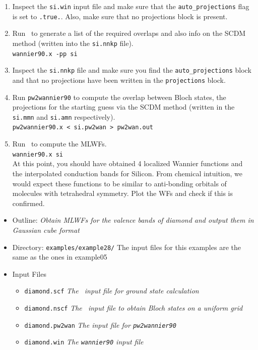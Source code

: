 \documentclass[a4paper,11pt,twoside]{article}
\begin{document}
\begin{itemize}
\begin{enumerate}
    \item Inspect the {\tt si.win} input file and make sure that the {\tt auto\_projections} flag is set to {\tt .true.}. Also, make sure that no projections block is present.
    \item Run \wannier\ to generate a list of the required overlaps and also info on the SCDM method (written
    into the {\tt si.nnkp} file).\\ 
    {\tt wannier90.x -pp si}
    \item Inspect the {\tt si.nnkp} file and make sure you find the {\tt auto\_projections} block and that no projections have been written in the {\tt projections} block.

    \item Run {\tt pw2wannier90} to compute the overlap between Bloch
    states, the projections for the starting guess via the SCDM method (written in the
    {\tt si.mmn} and {\tt si.amn} respectively).\\  
    {\tt pw2wannier90.x < si.pw2wan > pw2wan.out}

    \item Run \wannier\ to compute the MLWFs.\\
    {\tt wannier90.x si}\\
    At this point, you should have obtained 4 localized Wannier functions and the interpolated conduction bands for Silicon. From chemical intuition, we would expect these functions to be similar to anti-bonding orbitals of molecules with tetrahedral symmetry. Plot the WFs and check if this is confirmed. 
  \end{enumerate}
\end{itemize}

\begin{itemize}
\item{Outline: \it{Obtain MLWFs for the valence bands of diamond and output them in Gaussian cube format}}
\item{Directory: {\tt examples/example28/}}
The input files for this examples are the same as the ones in example05
\item{Input Files}
\begin{itemize}
\item{ {\tt diamond.scf}  {\it The \pwscf\ input file for ground state
    calculation}} 
\item{ {\tt diamond.nscf}  {\it The \pwscf\ input file to obtain Bloch
    states on a uniform grid}} 
\item{ {\tt diamond.pw2wan}  {\it The input file for {\tt pw2wannier90}}}
\item{ {\tt diamond.win}  {\it The {\tt wannier90} input file}}
\end{itemize}
\end{itemize}
\end{document}
